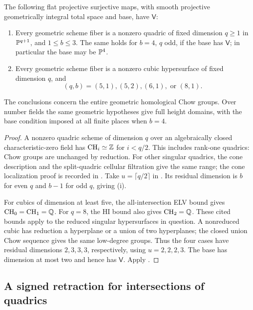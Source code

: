 \begin{corollary}\label{cor:quad-cubic-fibers}
The following flat projective surjective maps, with smooth projective
geometrically integral total space and base, have $\mathsf V$:
\begin{enumerate}[label=\textup{(\roman*)}]
\item Every geometric scheme fiber is a nonzero quadric of fixed
dimension $q\geq1$ in $\mathbb P^{q+1}$, and $1\leq b\leq3$.
The same holds for $b=4$, $q$ odd, if the base has $\mathsf V$;
in particular the base may be $\mathbb P^4$.
\item Every geometric scheme fiber is a nonzero cubic hypersurface
of fixed dimension $q$, and
\[
 (q,b)=(5,1),(5,2),(6,1),\text{ or }(8,1).
\]
\end{enumerate}
The conclusions concern the entire geometric homological Chow
groups. Over number fields the same geometric hypotheses give
full height domains, with the base condition imposed at all
finite places when $b=4$.
\end{corollary}

\begin{proof}
A nonzero quadric scheme of dimension $q$ over an algebraically
closed characteristic-zero field has $\operatorname{CH}_i\simeq\mathbb Z$ for
$i<q/2$. This includes rank-one quadrics: Chow groups are
unchanged by reduction. For other singular quadrics, the cone
description and the split-quadric cellular filtration give the
same range; the cone localization proof is recorded in
\cite{InternalFibrations}. Take $u=\lceil q/2\rceil$ in
. Its residual dimension is $b$ for even
$q$ and $b-1$ for odd $q$, giving (i).

For cubics of dimension at least five, the all-intersection
ELV bound gives $\operatorname{CH}_0=\operatorname{CH}_1=\mathbb Q$. For $q=8$, the HI bound
also gives $\operatorname{CH}_2=\mathbb Q$. These cited bounds apply to the reduced
singular hypersurfaces in question. A nonreduced cubic has
reduction a hyperplane or a union of two hyperplanes; the closed
union Chow sequence gives the same low-degree groups. Thus the
four cases have residual dimensions $2,3,3,3$, respectively,
using $u=2,2,2,3$. The base has dimension at most two and hence
has $\mathsf V$. Apply .
\end{proof}

\subsection{A signed retraction for intersections of quadrics}

